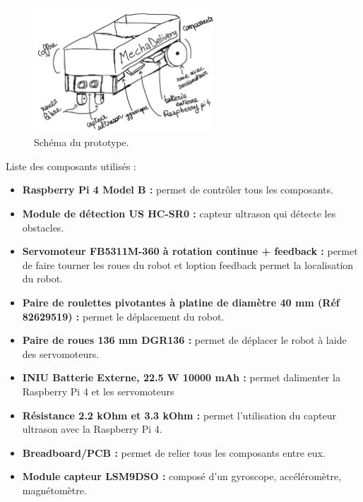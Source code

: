 \documentclass[a4paper,12pt]{report}  %
\begin{document}
\begin{figure}[H]
	\centering
	\includegraphics[width=0.6\textwidth]{./attachments/sketch.jpg}
	\caption{Schéma du prototype. }
	\label{fig:schema_proto}
\end{figure}

Liste des composants utilisés : 

\begin{itemize}
	\item
	\textbf{Raspberry Pi 4 Model B :} permet de contrôler tous les
	composants.
	
	\item
	\textbf{Module de détection US HC-SR0 :} capteur ultrason qui détecte
	les obstacles.
	
	\item
	\textbf{Servomoteur FB5311M-360 à rotation continue + feedback :}
	permet de faire tourner les roues du robot et l\textquotesingle option
	feedback permet la localisation du robot.
	
	\item
	\textbf{Paire de roulettes pivotantes à platine 
		de diamètre 40 mm (Réf 82629519) :} permet le déplacement du robot.
	
	\item
	\textbf{Paire de roues 136 mm DGR136 :} permet de déplacer le robot à
	l\textquotesingle aide des servomoteurs.
	
	\item
	\textbf{INIU Batterie Externe, 22.5 W 10000 mAh :} permet
	d\textquotesingle alimenter la Raspberry Pi 4 et les servomoteurs
	
	\item
	\textbf{Résistance 2.2 kOhm et 3.3 kOhm :} permet l'utilisation du
	capteur ultrason avec la Raspberry Pi 4.
	
	\item
	\textbf{Breadboard/PCB :} permet de relier tous les composants entre
	eux.
	
	\item
	\textbf{Module capteur LSM9DSO :} composé d'un gyroscope,
	accéléromètre, magnétomètre.
\end{itemize}
\end{document}
